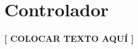 \documentclass{book}
\begin{document}
\section{Controlador}

\textbf{[ COLOCAR TEXTO AQUÍ ]}








%
%



\end{document}
